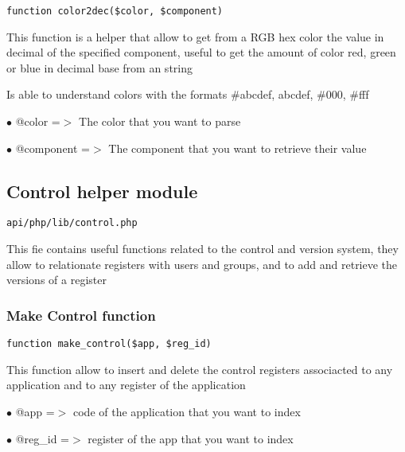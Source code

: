 \documentclass[a4paper]{article}
\begin{document}
\begin{lstlisting}
function color2dec($color, $component)
\end{lstlisting}

This function is a helper that allow to get from a RGB hex color the value
in decimal of the specified component, useful to get the amount of color
red, green or blue in decimal base from an string

Is able to understand colors with the formats \#abcdef, abcdef, \#000, \#fff

\begin{compactitem}
\item[\color{myblue}$\bullet$] @color     =$>$ The color that you want to parse
\item[\color{myblue}$\bullet$] @component =$>$ The component that you want to retrieve their value
\end{compactitem}

\hypertarget{toc398}{}
\subsection{Control helper module}

\begin{lstlisting}
api/php/lib/control.php
\end{lstlisting}

This fie contains useful functions related to the control and version system, they allow to
relationate registers with users and groups, and to add and retrieve the versions of a register

\hypertarget{toc399}{}
\subsubsection{Make Control function}

\begin{lstlisting}
function make_control($app, $reg_id)
\end{lstlisting}

This function allow to insert and delete the control registers associacted
to any application and to any register of the application

\begin{compactitem}
\item[\color{myblue}$\bullet$] @app    =$>$ code of the application that you want to index
\item[\color{myblue}$\bullet$] @reg\_id =$>$ register of the app that you want to index
\end{compactitem}
\end{document}
